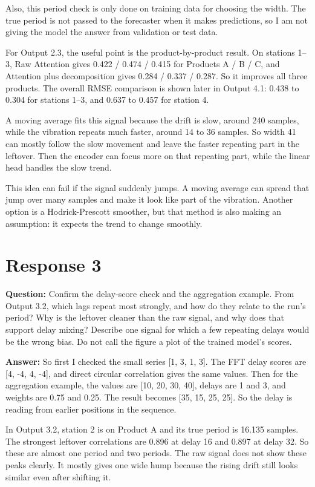 \documentclass[11pt]{article}
\begin{document}
Also, this period check is only done on training data for choosing the width. The true period is not passed to the forecaster when it makes predictions, so I am not giving the model the answer from validation or test data.

For Output 2.3, the useful point is the product-by-product result. On stations 1--3, Raw Attention gives 0.422 / 0.474 / 0.415 for Products A / B / C, and Attention plus decomposition gives 0.284 / 0.337 / 0.287. So it improves all three products. The overall RMSE comparison is shown later in Output 4.1: 0.438 to 0.304 for stations 1--3, and 0.637 to 0.457 for station 4.

A moving average fits this signal because the drift is slow, around 240 samples, while the vibration repeats much faster, around 14 to 36 samples. So width 41 can mostly follow the slow movement and leave the faster repeating part in the leftover. Then the encoder can focus more on that repeating part, while the linear head handles the slow trend.

This idea can fail if the signal suddenly jumps. A moving average can spread that jump over many samples and make it look like part of the vibration. Another option is a Hodrick-Prescott smoother, but that method is also making an assumption: it expects the trend to change smoothly.

\section*{Response 3}

\textbf{Question:} Confirm the delay-score check and the aggregation example. From Output 3.2, which lags repeat most strongly, and how do they relate to the run's period? Why is the leftover cleaner than the raw signal, and why does that support delay mixing? Describe one signal for which a few repeating delays would be the wrong bias. Do not call the figure a plot of the trained model's scores.

\textbf{Answer:} So first I checked the small series [1, 3, 1, 3]. The FFT delay scores are [4, -4, 4, -4], and direct circular correlation gives the same values. Then for the aggregation example, the values are [10, 20, 30, 40], delays are 1 and 3, and weights are 0.75 and 0.25. The result becomes [35, 15, 25, 25]. So the delay is reading from earlier positions in the sequence.

In Output 3.2, station 2 is on Product A and its true period is 16.135 samples. The strongest leftover correlations are 0.896 at delay 16 and 0.897 at delay 32. So these are almost one period and two periods. The raw signal does not show these peaks clearly. It mostly gives one wide hump because the rising drift still looks similar even after shifting it.
\end{document}
